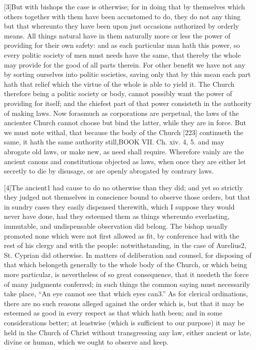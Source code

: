 [3]But with bishops the case is otherwise; for in doing that by themselves which others together with them have been accustomed to do, they do not any thing but that whereunto they have been upon just occasions authorized by orderly means. All things natural have in them naturally more or less the power of providing for their own safety: and as each particular man hath this power, so every politic society of men must needs have the same, that thereby the whole may provide for the good of all parts therein. For other benefit we have not any by sorting ourselves into politic societies, saving only that by this mean each part hath that relief which the virtue of the whole is able to yield it. The Church therefore being a politic society or body, cannot possibly want the power of providing for itself; and the chiefest part of that power consisteth in the authority of making laws. Now forasmuch as corporations are perpetual, the laws of the ancienter Church cannot choose but bind the latter, while they are in force. But we must note withal, that because the body of the Church [223] continueth the same, it hath the same authority still,BOOK VII. Ch. xiv. 4, 5. and may abrogate old laws, or make new, as need shall require. Wherefore vainly are the ancient canons and constitutions objected as laws, when once they are either let secretly to die by disusage, or are openly abrogated by contrary laws.

[4]The ancient1 had cause to do no otherwise than they did; and yet so strictly they judged not themselves in conscience bound to observe those orders, but that in sundry cases they easily dispensed therewith, which I suppose they would never have done, had they esteemed them as things whereunto everlasting, immutable, and undispensable observation did belong. The bishop usually promoted none which were not first allowed as fit, by conference had with the rest of his clergy and with the people: notwithstanding, in the case of Aurelius2, St. Cyprian did otherwise. In matters of deliberation and counsel, for disposing of that which belongeth generally to the whole body of the Church, or which being more particular, is nevertheless of so great consequence, that it needeth the force of many judgments conferred; in such things the common saying must necessarily take place, “An eye cannot see that which eyes can3.” As for clerical ordinations, there are no such reasons alleged against the order which is, but that it may be esteemed as good in every respect as that which hath been; and in some considerations better; at leastwise (which is sufficient to our purpose) it may be held in the Church of Christ without transgressing any law, either ancient or late, divine or human, which we ought to observe and keep.

